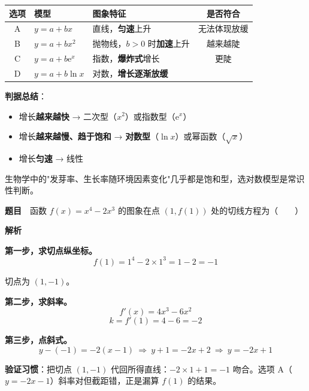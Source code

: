 \begin{center}
\begin{tabular}{cllc}
\toprule
选项 & 模型 & 图象特征 & 是否符合 \\
\midrule
A & $y=a+bx$ & 直线，\textbf{匀速}上升 &  无法体现放缓 \\
B & $y=a+bx^{2}$ & 抛物线，$b>0$ 时\textbf{加速}上升 &  越来越陡 \\
C & $y=a+b\mathrm e^{x}$ & 指数，\textbf{爆炸式}增长 &  更陡 \\
D & $y=a+b\ln x$ & 对数，\textbf{增长逐渐放缓} &  \\
\bottomrule
\end{tabular}
\end{center}


\begin{gktip}
\textbf{判据总结}：
\begin{itemize}
\item 增长\textbf{越来越快} → 二次型（$x^2$）或指数型（$\mathrm e^{x}$）
\item 增长\textbf{越来越慢、趋于饱和} → \textbf{对数型}（$\ln x$）或幂函数（$\sqrt x$）
\item 增长\textbf{匀速} → 线性
\end{itemize}

生物学中的"发芽率、生长率随环境因素变化"几乎都是饱和型，选对数模型是常识性判断。
\end{gktip}

\par\medskip


\textbf{题目}　函数 $f(x)=x^{4}-2x^{3}$ 的图象在点 $(1,f(1))$ 处的切线方程为（　　）

\textbf{解析}

\textbf{第一步，求切点纵坐标。}
\[f(1)=1^{4}-2\times1^{3}=1-2=-1\]

切点为 $(1,-1)$。

\textbf{第二步，求斜率。}
\[f'(x)=4x^{3}-6x^{2}\]
\[k=f'(1)=4-6=-2\]

\textbf{第三步，点斜式。}
\[y-(-1)=-2(x-1)\ \Longrightarrow\ y+1=-2x+2\ \Longrightarrow\ y=-2x+1\]


\begin{gktip}
\textbf{验证习惯}：把切点 $(1,-1)$ 代回所得直线：$-2\times1+1=-1$  吻合。选项 A（$y=-2x-1$）斜率对但截距错，正是漏算 $f(1)$ 的结果。
\end{gktip}

